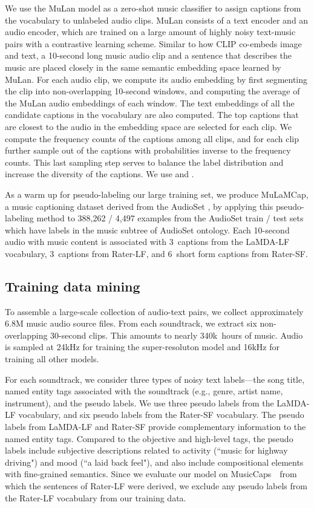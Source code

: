 \documentclass[nohyperref]{article}
\newcommand{\MusicCap}{MuLaMCap}
\newcommand{\EvalSet}{MusicCaps~\cite{musiclm2023}}
\theoremstyle{plain}
\theoremstyle{definition}
\theoremstyle{remark}
\begin{document}
We use the MuLan model as a zero-shot music classifier to assign captions from the vocabulary to unlabeled audio clips.
MuLan consists of a text encoder and an audio encoder, which are trained on a large amount of highly noisy text-music pairs with a contrastive learning scheme. Similar to how CLIP \cite{radford2021learning} co-embeds image and text, a 10-second long music audio clip and a sentence that describes the music are placed closely in the same semantic embedding space learned by MuLan.
For each audio clip, we compute its audio embedding by first segmenting the clip into non-overlapping 10-second windows, and computing the average of the MuLan audio embeddings of each window. The text embeddings of all the candidate captions in the vocabulary are also computed. The top  captions that are closest to the audio in the embedding space are selected for each clip.  
We compute the frequency counts of the captions among all clips, and for each clip further sample  out of the  captions with probabilities inverse to the frequency counts.
This last sampling step serves to balance the label distribution and increase the diversity of the captions. We use  and .

As a warm up for pseudo-labeling our large training set, we produce \MusicCap, a music captioning dataset derived from the AudioSet \cite{gemmeke2017audio}, by applying this pseudo-labeling method to 388,262 / 4,497 examples from the AudioSet train / test sets which have labels in the music subtree of AudioSet ontology. Each 10-second audio with music content is associated with 3~captions from the LaMDA-LF vocabulary, 3~captions from Rater-LF, and 6~short form captions from Rater-SF. 


\subsection{Training data mining}
To assemble a large-scale collection of audio-text pairs, we collect approximately 6.8M {music audio source files.}
From each {soundtrack}, we extract six non-overlapping 30-second clips. This amounts to nearly 340k~hours of music. Audio is sampled at 24kHz for training the super-resoluton model and 16kHz for training all other models.

For each {soundtrack}, we consider three types of noisy text labels---the song title, named entity tags associated with the {soundtrack} (e.g., genre, artist name, instrument), and the pseudo labels. We use three pseudo labels from the LaMDA-LF vocabulary, and six pseudo labels from the Rater-SF vocabulary.
The pseudo labels from LaMDA-LF and Rater-SF provide complementary information to the named entity tags. Compared to the objective and high-level tags, the pseudo labels include subjective descriptions related to activity (``music for highway driving") and mood (``a laid back feel"), and also include compositional elements with fine-grained semantics. 
Since we evaluate our model on \EvalSet~from which the sentences of Rater-LF were derived, we exclude any pseudo labels from the Rater-LF vocabulary from our training data.
\end{document}
